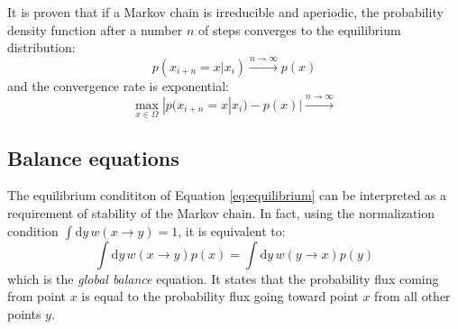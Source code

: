 It is proven \cite{mc-mt} that if a Markov chain is irreducible and aperiodic,
the probability density function after a number $n$ of steps converges to the equilibrium distribution:
\begin{equation}\label{eq:convergence}
	p(x_{i+n}=x|x_i) \xrightarrow{n\to\infty} p(x)
\end{equation}
and the convergence rate is exponential:
\begin{equation}\label{eq:convergence_rate}
	\max_{x\in\Omega} |p(x_{i+n}=x|x_i) - p(x)| \xrightarrow{n\to\infty} 
\end{equation}

\subsection*{Balance equations}
The equilibrium condititon of Equation \eqref{eq:equilibrium}
can be interpreted as a requirement of stability of the Markov chain.
In fact, using the normalization condition $\int\mathrm dy\,w(x \to y) = 1$,
it is equivalent to:
\[
	\int\mathrm dy\,w(x \to y)p(x) = \int\mathrm dy\,w(y \to x)p(y)
\]
which is the \emph{global balance} equation.
It states that the probability flux coming from point $x$
is equal to the probability flux going toward point $x$ from all other points $y$.









